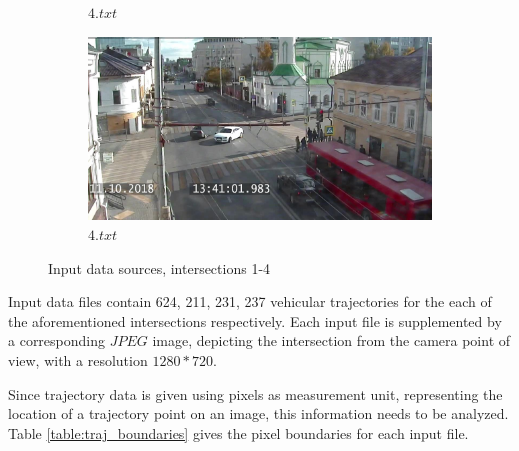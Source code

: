 \begin{figure}[!htb]
\begin{subfigure}[!htb]{0.48\textwidth}
		\caption{$4.txt$}
		\label{fig:is_3}
	\end{subfigure}
	\hfill
	\begin{subfigure}[!htb]{0.48\textwidth}
		\centering{}
		\includegraphics[width=\textwidth]{images/is-4.jpg}
		\caption{$4.txt$}
		\label{fig:is_4}
	\end{subfigure}
	\caption{Input data sources, intersections 1-4}
	\label{fig:is_all}
\end{figure}

Input data files contain 624, 211, 231, 237 vehicular trajectories for the each of the aforementioned intersections respectively. Each input file is supplemented by a corresponding $JPEG$ image, depicting the intersection from the camera point of view, with a resolution $1280 * 720$. 

Since trajectory data is given using pixels as measurement unit, representing the location of a trajectory point on an image, this information needs to be analyzed. Table \ref{table:traj_boundaries} gives the pixel boundaries for each input file.


